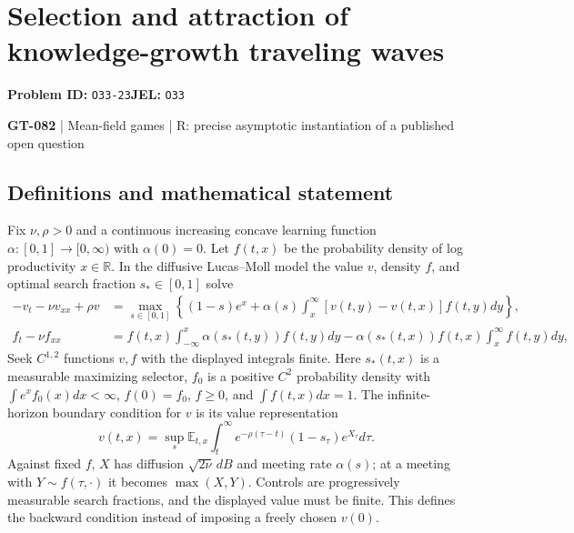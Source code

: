 \documentclass[11pt,a4paper]{article}
\begin{document}
\section*{Selection and attraction of knowledge-growth traveling waves}
\textbf{Problem ID:} \texttt{O33-23}\quad \textbf{JEL:} \texttt{O33}\par
\label{problem:OP-0212}
\label{game:GT-082}
{\sffamily\small\color{muted}
{\small\textbf{GT-082} | Mean-field games | R: precise asymptotic instantiation of a published open question\par}
\par}
\subsection*{Definitions and mathematical statement}
Fix $\nu,\rho>0$ and a continuous increasing concave learning function $\alpha:[0,1]\to[0,\infty)$ with $\alpha(0)=0$. Let $f(t,x)$ be the probability density of log productivity $x\in\mathbb R$. In the diffusive Lucas--Moll model the value $v$, density $f$, and optimal search fraction $s_*\in[0,1]$ solve
\[
 \begin{split}
 -v_t-\nu v_{xx}+\rho v
 &=\max_{s\in[0,1]}\left\{(1-s)e^x+
 \alpha(s)\int_x^\infty[v(t,y)-v(t,x)]f(t,y)dy\right\},\\
 f_t-\nu f_{xx}
 &=f(t,x)\int_{-\infty}^x\alpha(s_*(t,y))f(t,y)dy
   -\alpha(s_*(t,x))f(t,x)\int_x^\infty f(t,y)dy,
 \end{split}
\]
Seek $C^{1,2}$ functions $v,f$ with the displayed integrals finite. Here $s_*(t,x)$ is a measurable maximizing selector, $f_0$ is a positive $C^2$ probability density with $\int e^xf_0(x)dx<\infty$, $f(0)=f_0$, $f\geq0$, and $\int f(t,x)dx=1$. The infinite-horizon boundary condition for $v$ is its value representation
\[
 v(t,x)=\sup_s\mathbb E_{t,x}\int_t^\infty
       e^{-\rho(\tau-t)}(1-s_\tau)e^{X_\tau}d\tau.
\]
Against fixed $f$, $X$ has diffusion $\sqrt{2\nu}\,dB$ and meeting rate $\alpha(s)$; at a meeting with $Y\sim f(\tau,\cdot)$ it becomes $\max(X,Y)$. Controls are progressively measurable search fractions, and the displayed value must be finite. This defines the backward condition instead of imposing a freely chosen $v(0)$.
\end{document}
